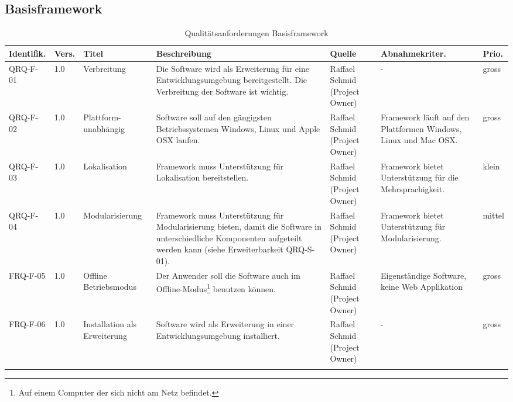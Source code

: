 \begin{landscape}
\begin{longtable}{|p{1.6cm}|p{0.7cm}|p{2.5cm}|p{4.5cm}|p{2.6cm}|p{4cm}|p{0.9cm}|}
\end{longtable}
\subsection{Basisframework}\label{anforderungen_framework}
\begin{longtable}{|p{1.6cm}|p{0.7cm}|p{2.5cm}|p{4.5cm}|p{2.6cm}|p{4cm}|p{0.9cm}|}
    \hline\textbf{Identifik.} & \textbf{Vers.}& \textbf{Titel} & \textbf{Beschreibung} & \textbf{Quelle} & \textbf{Abnahmekriter.} & \textbf{Prio.}\\\hline
   QRQ-F-01 & 1.0 & Verbreitung & Die Software wird als Erweiterung für eine Entwicklungsumgebung bereitgestellt. Die Verbreitung der Software ist wichtig. & Raffael Schmid (Project Owner) & - & gross \\\hline

   QRQ-F-02 & 1.0 & Plattform-unabhängig & Software soll auf den gängigsten Betriebssystemen Windows, Linux und Apple OSX laufen. & Raffael Schmid (Project Owner) &  Framework läuft auf den Plattformen Windows, Linux und Mac OSX. & gross \\\hline

   QRQ-F-03 & 1.0 & Lokalisation & Framework muss Unterstützung für Lokalisation bereitstellen.& Raffael Schmid (Project Owner) & Framework bietet Unterstützung für die Mehrsprachigkeit. &klein \\\hline

   QRQ-F-04 & 1.0 & Modularisierung & Framework muss Unterstützung für Modularisierung bieten, damit die Software in unterschiedliche Komponenten aufgeteilt werden kann (siehe Erweiterbarkeit QRQ-S-01). & Raffael Schmid (Project Owner) & Framework bietet Unterstützung für Modularisierung.&mittel \\\hline

   FRQ-F-05 & 1.0 & Offline Betriebsmodus & Der Anwender soll die Software auch im Offline-Modus\footnote{Auf einem Computer der sich nicht am Netz befindet.} benutzen können. & Raffael Schmid (Project Owner) & Eigenständige Software, keine Web Applikation & gross  \\\hline

   FRQ-F-06 & 1.0 & Installation als Erweiterung& Software wird als Erweiterung in einer Entwicklungsumgebung installiert. & Raffael Schmid (Project Owner) & - & gross  \\\hline
    \caption{Qualitätsanforderungen Basisframework}
\end{longtable}
\end{landscape}
